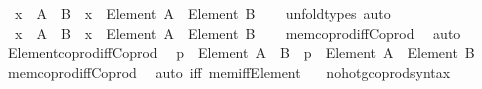 \begin{isabellebody}
\ \ {\isachardoublequoteopen}x\ {\isasymin}\ {\isacharparenleft}{\kern0pt}A\ {\isasymCoprod}\ B{\isacharparenright}{\kern0pt}\ {\isasymlongleftrightarrow}\ x\ {\isacharcolon}{\kern0pt}\ {\isacharparenleft}{\kern0pt}Element\ A\ {\isasymCoprod}\ Element\ B{\isacharparenright}{\kern0pt}{\isachardoublequoteclose}\isanewline
%
\isadelimproof
\ \ %
\endisadelimproof
%
\isatagproof
{}\isamarkupfalse%
\ unfold{\isacharunderscore}{\kern0pt}types\ auto%
\endisatagproof
{\isafoldproof}%
%
\isadelimproof
\isanewline
%
\endisadelimproof
\isanewline
{}\isamarkupfalse%
\isanewline
\ \ {\isachardoublequoteopen}x\ {\isasymin}\ {\isacharparenleft}{\kern0pt}A\ {\isasymCoprod}\ B{\isacharparenright}{\kern0pt}{\isachardoublequoteclose}\ {\isasymrightleftharpoons}\ {\isachardoublequoteopen}x\ {\isacharcolon}{\kern0pt}\ {\isacharparenleft}{\kern0pt}Element\ A\ {\isasymCoprod}\ Element\ B{\isacharparenright}{\kern0pt}{\isachardoublequoteclose}\isanewline
%
\isadelimproof
\ \ %
\endisadelimproof
%
\isatagproof
{}\isamarkupfalse%
\ mem{\isacharunderscore}{\kern0pt}coprod{\isacharunderscore}{\kern0pt}iff{\isacharunderscore}{\kern0pt}Coprod\ \isamarkupfalse%
\ auto%
\endisatagproof
{\isafoldproof}%
%
\isadelimproof
\isanewline
%
\endisadelimproof
\isanewline
\isanewline
{}\isamarkupfalse%
\ Element{\isacharunderscore}{\kern0pt}coprod{\isacharunderscore}{\kern0pt}iff{\isacharunderscore}{\kern0pt}Coprod{\isacharcolon}{\kern0pt}\isanewline
\ \ {\isachardoublequoteopen}p\ {\isacharcolon}{\kern0pt}\ Element\ {\isacharparenleft}{\kern0pt}A\ {\isasymCoprod}\ B{\isacharparenright}{\kern0pt}\ {\isasymlongleftrightarrow}\ p\ {\isacharcolon}{\kern0pt}\ Element\ A\ {\isasymCoprod}\ Element\ B{\isachardoublequoteclose}\isanewline
%
\isadelimproof
\ \ %
\endisadelimproof
%
\isatagproof
{}\isamarkupfalse%
\ mem{\isacharunderscore}{\kern0pt}coprod{\isacharunderscore}{\kern0pt}iff{\isacharunderscore}{\kern0pt}Coprod\ \isamarkupfalse%
\ {\isacharparenleft}{\kern0pt}auto\ iff{\isacharcolon}{\kern0pt}\ mem{\isacharunderscore}{\kern0pt}iff{\isacharunderscore}{\kern0pt}Element{\isacharparenright}{\kern0pt}%
\endisatagproof
{\isafoldproof}%
%
\isadelimproof
\isanewline
%
\endisadelimproof
\isanewline
{}\isamarkupfalse%
\isanewline
\ \ \ no{\isacharunderscore}{\kern0pt}hotg{\isacharunderscore}{\kern0pt}coprod{\isacharunderscore}{\kern0pt}syntax\isanewline
{}\isanewline
\isanewline

\end{isabellebody}
